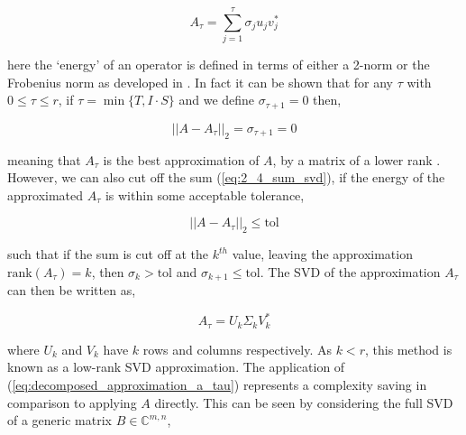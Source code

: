 \begin{equation}
    A_\tau = \sum_{j=1}^{\tau}\sigma_j u_j v_j^*
    \label{eq:2_4_sum_svd}
\end{equation}

here the `energy' of an operator is defined in terms of either a 2-norm or the
Frobenius norm as developed in \cite{Trefethen:1997:SIAM}. In fact it can be shown
that for any $\tau$ with $0 \leq \tau \leq r$, if $\tau = \min \{T, I \cdot S\}$
and we define $\sigma_{\tau + 1} = 0$ then,

\begin{equation}
    ||A - A_\tau ||_2 = \sigma_{\tau+1} = 0
\end{equation}

meaning that $A_\tau$ is the best approximation of $A$, by a matrix of a lower rank
\cite{Trefethen:1997:SIAM}. However, we can also cut off the sum (\ref{eq:2_4_sum_svd}),
if the energy of the approximated $A_\tau$ is within some acceptable tolerance,

\begin{equation}
    ||A - A_\tau ||_2  \leq  \text{tol}
\end{equation}

such that if the sum is cut off at the $k^{th}$ value, leaving the approximation
$\text{rank}(A_\tau) = k$, then $\sigma_k > \text{tol}$ and
$\sigma_{k+1} \leq \text{tol}$. The \gls{SVD} of the approximation $A_\tau$ can
then be written as,

\begin{equation}
    A_\tau = U_k \Sigma_k V_k^*
    \label{eq:decomposed_approximation_a_tau}
\end{equation}

where $U_k$ and $V_k$ have $k$ rows and columns respectively. As $k < r$, this
method is known as a low-rank SVD approximation. The application of
(\ref{eq:decomposed_approximation_a_tau}) represents a complexity saving in
comparison to applying $A$ directly. This can be seen by considering the full
SVD of a generic matrix $B \in \mathbb{C}^{m, n}$,

